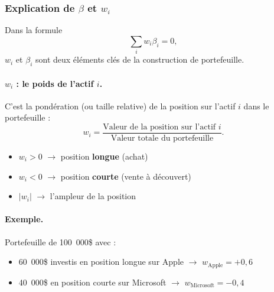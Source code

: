 \documentclass{article}
\begin{document}
\subsubsection{Explication de $\beta$ et $w_i$}
Dans la formule
\begin{equation}
    \sum_i w_i \beta_i = 0,
\end{equation}
$w_i$ et $\beta_i$ sont deux éléments clés de la construction de portefeuille.
\paragraph{$w_i$ : le poids de l'actif $i$.}
C'est la pondération (ou taille relative) de la position sur l'actif $i$ dans le portefeuille :
\begin{equation}
    w_i = \frac{\text{Valeur de la position sur l'actif } i}{\text{Valeur totale du portefeuille}}.
\end{equation}
\begin{itemize}
    \item $w_i > 0$ $\rightarrow$ position \textbf{longue} (achat)
    \item $w_i < 0$ $\rightarrow$ position \textbf{courte} (vente à découvert)
    \item $|w_i|$ $\rightarrow$ l'ampleur de la position
\end{itemize}
\paragraph{Exemple.} Portefeuille de 100~000\$ avec :
\begin{itemize}
    \item 60~000\$ investis en position longue sur Apple $\rightarrow$ $w_{\text{Apple}} = +0{,}6$
    \item 40~000\$ en position courte sur Microsoft $\rightarrow$ $w_{\text{Microsoft}} = -0{,}4$
\end{itemize}
\end{document}
